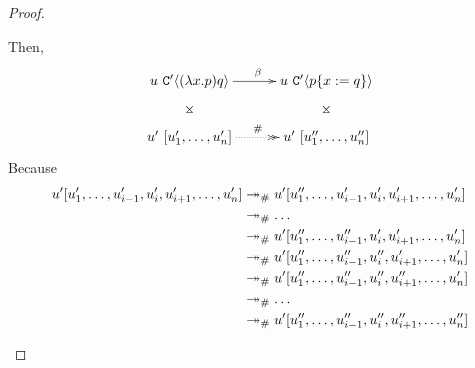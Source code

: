 \begin{proof}
\begin{enumerate}
Then,
\[
\xymatrix@C=1cm{
 \tmthree\ \contwoof{(\lam{\var}{\tmfive}) \tmsix} \ar@{}[d]|*=0[@]{\rtimes} \ar[r]^{\beta}
    & \tmthree\ \contwoof{\subs{\tmfive}{\var}{\tmsix}} \ar@{}[d]|*=0[@]{\rtimes} \\
 \tmthree'\ [\tmthree'_1, \hdots, \tmthree'_n] \ar@{.>>}[r]^{\dist}
    & \tmthree'\ [\tmthree''_1, \hdots, \tmthree''_n] \\
}
\]
Because
\begin{equation*}\begin{split}
 u' [u'_1, \hdots, u'_{i-1}, u'_i, u'_{i+1}, \hdots, u'_n]
    & \mathrel{\mathrel{\twoheadrightarrow}_{\mathtt{\#}}} u' [u''_1, \hdots, u'_{i-1}, u'_i, u'_{i+1}, \hdots, u'_n] \\
    & \mathrel{\mathrel{\twoheadrightarrow}_{\mathtt{\#}}} \hdots \\
    & \mathrel{\mathrel{\twoheadrightarrow}_{\mathtt{\#}}} u' [u''_1, \hdots, u''_{i-1}, u'_i, u'_{i+1}, \hdots, u'_n] \\
    & \mathrel{\mathrel{\twoheadrightarrow}_{\mathtt{\#}}} u' [u''_1, \hdots, u''_{i-1}, u''_i, u'_{i+1}, \hdots, u'_n] \\
    & \mathrel{\mathrel{\twoheadrightarrow}_{\mathtt{\#}}} u' [u''_1, \hdots, u''_{i-1}, u''_i, u''_{i+1}, \hdots, u'_n] \\
    & \mathrel{\mathrel{\twoheadrightarrow}_{\mathtt{\#}}} \hdots \\
    & \mathrel{\mathrel{\twoheadrightarrow}_{\mathtt{\#}}} u' [u''_1, \hdots, u''_{i-1}, u''_i, u''_{i+1}, \hdots, u''_n] \\
\end{split}\end{equation*}
\end{enumerate}
\end{proof}
